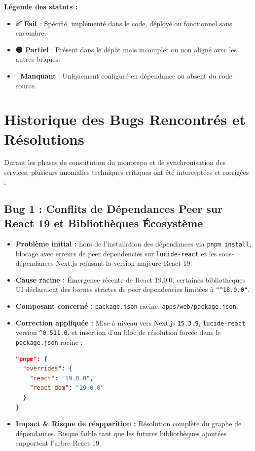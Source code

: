 \documentclass[11pt,a4paper]{article}
\begin{document}
\textbf{Légende des statuts :}
\begin{itemize}
    \item \textcolor{accentGreen}{\textbf{✅ Fait}} : Spécifié, implémenté dans le code, déployé ou fonctionnel sans encombre.
    \item \textcolor{accentOrange}{\textbf{🟡 Partiel}} : Présent dans le dépôt mais incomplet ou non aligné avec les autres briques.
    \item \textcolor{accentRed}{\textbf{🔴 Manquant}} : Uniquement configuré en dépendance ou absent du code source.
\end{itemize}

\section{Historique des Bugs Rencontrés et Résolutions}

Durant les phases de constitution du monorepo et de synchronisation des services, plusieurs anomalies techniques critiques ont été interceptées et corrigées :

\subsection{Bug 1 : Conflits de Dépendances Peer sur React 19 et Bibliothèques Écosystème}
\begin{itemize}
    \item \textbf{Problème initial :} Lors de l'installation des dépendances via \texttt{pnpm install}, blocage avec erreurs de peer dependencies sur \texttt{lucide-react} et les sous-dépendances Next.js refusant la version majeure React 19.
    \item \textbf{Cause racine :} Émergence récente de React 19.0.0; certaines bibliothèques UI déclaraient des bornes strictes de peer dependencies limitées à \texttt{"^18.0.0"}.
    \item \textbf{Composant concerné :} \texttt{package.json} racine, \texttt{apps/web/package.json}.
    \item \textbf{Correction appliquée :} Mise à niveau vers Next.js \texttt{15.3.9}, \texttt{lucide-react} version \texttt{^0.511.0}, et insertion d'un bloc de résolution forcée dans le \texttt{package.json} racine :
\begin{lstlisting}[language=json]
"pnpm": {
  "overrides": {
    "react": "19.0.0",
    "react-dom": "19.0.0"
  }
}
\end{lstlisting}
    \item \textbf{Impact \& Risque de réapparition :} Résolution complète du graphe de dépendances. Risque faible tant que les futures bibliothèques ajoutées supportent l'arbre React 19.
\end{itemize}
\end{document}
